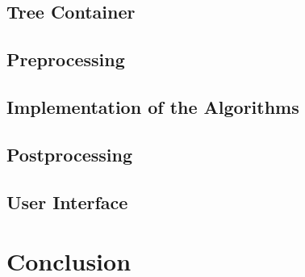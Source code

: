 \documentclass[10pt,twoside,a4paper]{report}
\begin{document}
\section{Tree Container}
\section{Preprocessing}
\section{Implementation of the Algorithms}
\section{Postprocessing}
\section{User Interface}

\chapter{Conclusion}
\cleardoublepage

\appendix

\cleardoublepage



\end{document}
